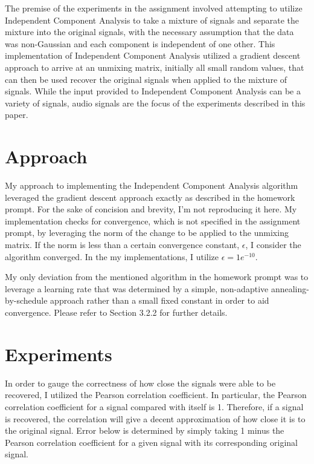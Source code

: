 \documentclass{article} %
\begin{document}
The premise of the experiments in the assignment involved attempting to utilize Independent Component Analysis to take a mixture of signals and separate the mixture into the original signals, with the necessary assumption that the data was non-Gaussian and each component is independent of one other. This implementation of Independent Component Analysis utilized a gradient descent approach to arrive at an unmixing matrix, initially all small random values, that can then be used recover the original signals when applied to the mixture of signals. While the input provided to Independent Component Analysis can be a variety of signals, audio signals are the focus of the experiments described in this paper.

\section{Approach}

My approach to implementing the Independent Component Analysis algorithm leveraged the gradient descent approach exactly as described in the homework prompt. For the sake of concision and brevity, I'm not reproducing it here. My implementation checks for convergence, which is not specified in the assignment prompt, by leveraging the norm of the change to be applied to the unmixing matrix. If the norm is less than a certain convergence constant, \(\epsilon\), I consider the algorithm converged. In the my implementations, I utilize \(\epsilon = 1e^{-10}\).

My only deviation from the mentioned algorithm in the homework prompt was to leverage a learning rate that was determined by a simple, non-adaptive annealing-by-schedule approach rather than a small fixed constant in order to aid convergence. Please refer to Section 3.2.2 for further details.

\section{Experiments}

In order to gauge the correctness of how close the signals were able to be recovered, I utilized the Pearson correlation coefficient. In particular, the Pearson correlation coefficient for a signal compared with itself is 1. Therefore, if a signal is recovered, the correlation will give a decent approximation of how close it is to the original signal. Error below is determined by simply taking 1 minus the Pearson correlation coefficient for a given signal with its corresponding original signal.
\end{document}
